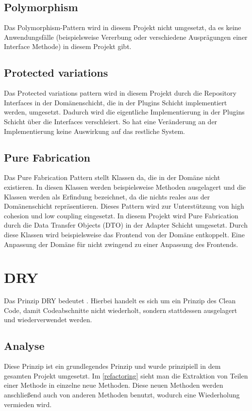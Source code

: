     \subsection{Polymorphism}
    Das Polymorphism-Pattern wird in diesem Projekt nicht umgesetzt, da es keine Anwendungsfälle (beispielsweise Vererbung oder verschiedene Ausprägungen einer Interface Methode) in diesem Projekt gibt.
    
    \subsection{Protected variations}
    Das Protected variations pattern wird in diesem Projekt durch die Repository Interfaces in der Domänenschicht, die in der Plugins Schicht implementiert werden, umgesetzt. Dadurch wird die eigentliche Implementierung in der Plugins Schicht über die Interfaces verschleiert. So hat eine Veränderung an der Implementierung keine Auswirkung auf das restliche System.
    
    \subsection{Pure Fabrication}
    Das Pure Fabrication Pattern stellt Klassen da, die in der Domäne nicht existieren. In diesen Klassen werden beispielsweise Methoden ausgelagert und die Klassen werden als Erfindung bezeichnet, da die nichts reales aus der Domänenschicht repräsentieren. Dieses Pattern wird zur Unterstützung von high cohesion und low coupling eingesetzt. In diesem Projekt wird Pure Fabrication durch die Data Transfer Objects (DTO) in der Adapter Schicht umgesetzt. Durch diese Klassen wird beispielsweise das Frontend von der Domäne entkoppelt. Eine Anpassung der Domäne für nicht zwingend zu einer Anpassung des Frontends.

\section{DRY}
Das Prinzip DRY bedeutet . Hierbei handelt es sich um ein Prinzip des Clean Code, damit Codeabschnitte nicht wiederholt, sondern stattdessen ausgelagert und wiederverwendet werden.

    \subsection{Analyse}
    Diese Prinzip ist ein grundlegendes Prinzip und wurde prinzipiell in dem gesamten Projekt umgesetzt. Im \cref{refactoring} sieht man die Extraktion von Teilen einer Methode in einzelne neue Methoden. Diese neuen Methoden werden anschließend auch von anderen Methoden benutzt, wodurch eine Wiederholung vermieden wird.
    

